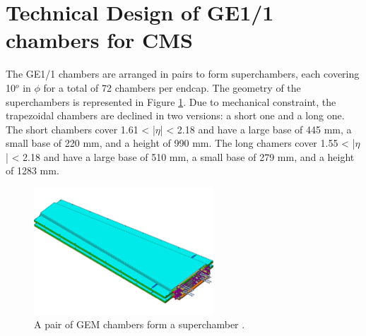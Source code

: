   \section{Technical Design of GE1/1 chambers for CMS}

    The GE1/1 chambers are arranged in pairs to form superchambers, each covering 10$^o$ in $ \phi $ for a total of 72 chambers per endcap. The geometry of the superchambers is represented in Figure \ref{fig:II-1-superchamber}. Due to mechanical constraint, the trapezoidal chambers are declined in two versions: a short one and a long one. The short chambers cover 1.61 < |$\eta$| < 2.18 and have a large base of 445 mm, a small base of 220 mm, and a height of 990 mm. The long chamers cover 1.55 < |$\eta$| < 2.18 and have a large base of 510 mm, a small base of 279 mm, and a height of 1283 mm. \\

    \begin{figure}[h!]
      \centering
      \includegraphics[width=0.6\textwidth]{img/II-1-gem/superchamber.pdf}
      \caption{A pair of GEM chambers form a superchamber \cite{Colaleo:2021453}.}
      \label{fig:II-1-superchamber}
    \end{figure}

